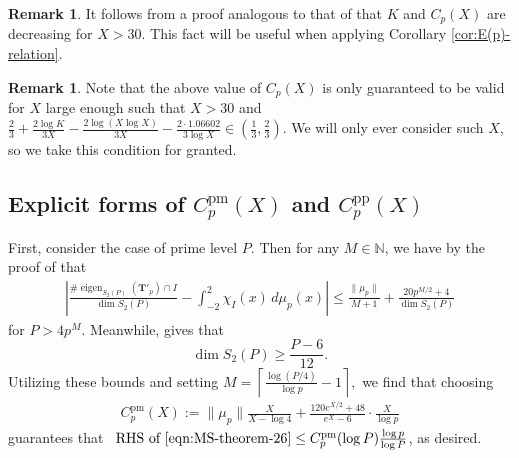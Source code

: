 \documentclass[11pt,letterpaper,reqno]{amsart}
\theoremstyle{definition}
\newtheorem{remark}[theorem]{Remark}
\numberwithin{equation}{section}
\numberwithin{figure}{section}
\numberwithin{table}{section}
\let\subsectiontemp\subsection
\renewcommand{\subsection}[1]{ 
    \subsectiontemp{#1} \hfill\vspace{0.5\linespacing} 
}
\newcommand{\lrp}[1]{\!\left(#1\right)}
\begin{document}
    \begin{remark}
        It follows from a proof analogous to that of \cite[Lemma A.5]{KMRX} that $K$ and $C_p(X)$ are decreasing for $X > 30.$ This fact will be useful when applying Corollary \ref{cor:E(p)-relation}.
    \end{remark}
    
\begin{remark}\label{rmk:domain-restriction-on-X}
    Note that the above value of $C_p(X)$ is only guaranteed to be valid for $X$ large enough such that $X > 30$ and $\frac{2}{3} + \frac{2 \log K}{3 X} - \frac{2\log \left( X \log X \right)}{3X} - \frac{2 \cdot 1.06602}{3 \log X} \in \lrp{\frac{1}{3}, \frac{2}{3}}$. We will only ever consider such $X$, so we take this condition for granted.
\end{remark}

\subsection{Explicit forms of \texorpdfstring{$C_p^{\operatorname{pm}}(X)$}{Cppm(X)} and \texorpdfstring{$C_p^{\operatorname{pp}}(X)$}{Cppp(X)}}\label{subsection:explicit-form-prime-divisors}

First, consider the case of prime level $P$. Then for any $M \in \mathbb{N}$, we have by the proof of \cite[Theorem 26]{MS07} that
\begin{align}
    \left|
\frac{\# \operatorname{eigen}_{S_2(P)}(\mathbf{T}'_p) \cap I}
{\dim S_2(P)}
-
\int_{-2}^2 \chi_I(x)\, d\mu_p(x)
\right| \leq \frac{\| \mu_p\|}{M + 1} + \frac{20 p^{M/2} + 4}{\dim S_2(P)} \label{eqn:MS-theorem-26}
\end{align}
 for $P > 4p^{M}.$ Meanwhile, \cite[Lemma 24]{MS07} gives that
$$\dim S_2(P) \geq \frac{P - 6}{12}.$$
Utilizing these bounds and setting $M = \left\lceil \frac{\log(P/4)}{\log p} - 1 \right\rceil,$ we find that choosing
\begin{align}
    C_p^{\operatorname{pm}}(X) := \| \mu_p \| \frac{X}{X -\log 4} + \frac{120 e^{X/2} + 48}{e^X - 6} \cdot \frac{X}{\log p} \label{eqn:formula-for-C-p}
\end{align}
guarantees that \  $\text{RHS of \eqref{eqn:MS-theorem-26}} \le C_p^\mathrm{pm}(\log P) \frac{\log p}{\log P}$, as desired.
\end{document}
